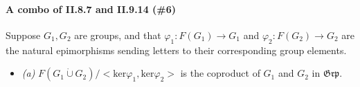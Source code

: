 \documentclass[12pt,letterpaper]{article}
\begin{document}
\pagebreak
\paragraph{A combo of II.8.7 and II.9.14 (\#6)} Suppose $G_1, G_2$ are groups, and that $\varphi_1 : F(G_1) \rightarrow G_1$ and $\varphi_2 : F(G_2) \rightarrow G_2$ are the natural epimorphisms sending letters to their corresponding group elements.
\begin{itemize}
	\item\textit{(a)} $F(G_1 \dot{\cup} G_2) / <\mathrm{ker }\varphi_1, \mathrm{ker }\varphi_2>$ is the coproduct of $G_1$ and $G_2$ in $\mathfrak{Grp}$.
\end{itemize}












\pagebreak
\end{document}
